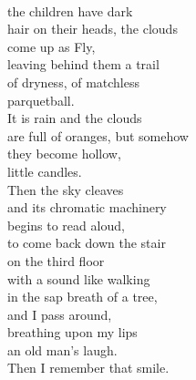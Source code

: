 \documentclass[smalldemyvopaper,11pt,twoside,onecolumn,openright,extrafontsizes]{memoir}
\begin{document}
\\the children have dark
\\hair on their heads, the clouds
\\come up as Fly,
\\leaving behind them a trail
\\of dryness, of matchless
\\parquetball.
\\It is rain and the clouds
\\are full of oranges, but somehow
\\they become hollow,
\\little candles.
\\Then the sky cleaves
\\and its chromatic machinery
\\begins to read aloud,
\\to come back down the stair
\\on the third floor
\\with a sound like walking
\\in the sap breath of a tree,
\\and I pass around,
\\breathing upon my lips
\\an old man's laugh.
\\Then I remember that smile.
\end{document}
